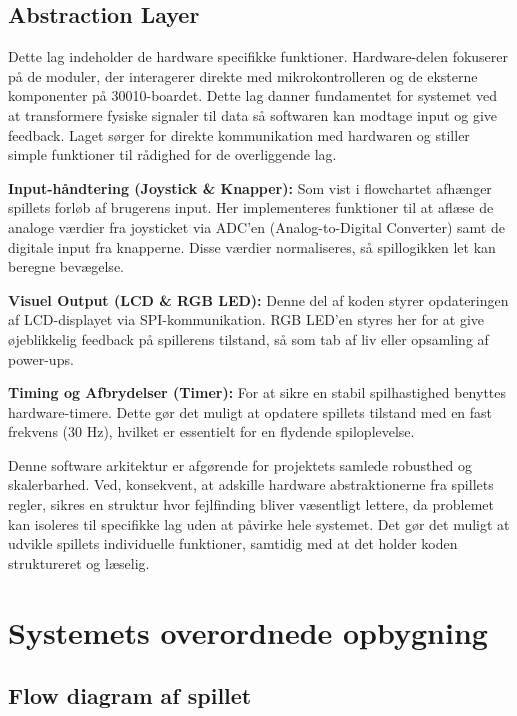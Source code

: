 \subsection{Abstraction Layer}
Dette lag indeholder de hardware specifikke funktioner. 
Hardware-delen fokuserer på de moduler, der interagerer direkte med mikrokontrolleren og de eksterne komponenter på 30010-boardet. Dette lag danner fundamentet for systemet ved at transformere fysiske signaler til data så softwaren kan modtage input og give feedback.
Laget sørger for direkte kommunikation med hardwaren og stiller simple funktioner til rådighed for de overliggende lag. 

\textbf{Input-håndtering (Joystick \& Knapper):} 
Som vist i flowchartet afhænger spillets forløb af brugerens input. Her implementeres funktioner til at aflæse de analoge værdier fra joysticket via ADC’en (Analog-to-Digital Converter) samt de digitale input fra knapperne. Disse værdier normaliseres, så spillogikken let kan beregne bevægelse.

\textbf{Visuel Output (LCD \& RGB LED):} 
Denne del af koden styrer opdateringen af LCD-displayet via SPI-kommunikation. RGB LED’en styres her for at give øjeblikkelig feedback på spillerens tilstand, så som tab af liv eller opsamling af power-ups.

\textbf{Timing og Afbrydelser (Timer):} 
For at sikre en stabil spilhastighed benyttes hardware-timere. Dette gør det muligt at opdatere spillets tilstand med en fast frekvens (30 Hz), hvilket er essentielt for en flydende spiloplevelse.

Denne software arkitektur er afgørende for projektets samlede robusthed og skalerbarhed. Ved, konsekvent, at adskille hardware abstraktionerne fra spillets regler, sikres en struktur hvor fejlfinding bliver væsentligt lettere, da problemet kan isoleres til specifikke lag uden at påvirke hele systemet. Det gør det muligt at udvikle spillets individuelle funktioner, samtidig med at det holder koden struktureret og læselig.

\section{Systemets overordnede opbygning} \label{chap:ProduktUdvikling_sec:overordnet opbygning}
\vspace{0.5em}

\subsection{Flow diagram af spillet} \label{chap:ProduktUdvikling_sec:flowchart}

